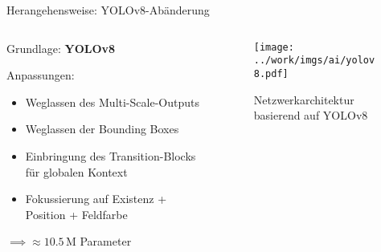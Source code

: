 \begin{frame}{Herangehensweise: YOLOv8-Abänderung}
    \begin{columns}
        \begin{column}{0.6\linewidth}

            Grundlage: \textbf{YOLOv8}

            Anpassungen:
            \begin{itemize}
                \item Weglassen des Multi-Scale-Outputs
                \item Weglassen der Bounding Boxes
                \item Einbringung des Transition-Blocks für globalen Kontext
                \item Fokussierung auf Existenz + Position + Feldfarbe
            \end{itemize}

            $\implies \approx 10.5\,\text{M}$ Parameter

        \end{column}
        \begin{column}{0.4\linewidth}

            \begin{figure}
                \centering
                \texttt{[image: ../work/imgs/ai/yolov8.pdf]}
                \caption{Netzwerkarchitektur basierend auf YOLOv8}
            \end{figure}

        \end{column}
    \end{columns}
\end{frame}


